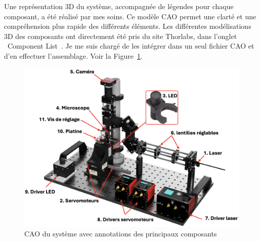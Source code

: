 \newpage
Une représentation 3D du système, accompagnée de légendes pour chaque composant, a été réalisé par mes soins.\label{modelisation_3D} Ce modèle CAO permet une clarté et une compréhension plus rapide des différents éléments. Les différentes modélisations 3D des composants ont directement été pris du site Thorlabs, dans l'onglet \guillemotleft~Component List~\guillemetright \cite{portableOpticalTweezers}. Je me suis chargé de les intégrer dans un seul fichier CAO et d'en effectuer l'assemblage. Voir la Figure~\ref{kit_CAO_vierge_annote}.

\begin{figure}[H]
    \begin{center}
        \includegraphics[width=\textwidth]{assets/figures/Introduction/Kit_CAO_vierge_annote.png}
    \end{center}
    \caption{CAO du système avec annotations des principaux composants}
    \label{kit_CAO_vierge_annote}
\end{figure}


